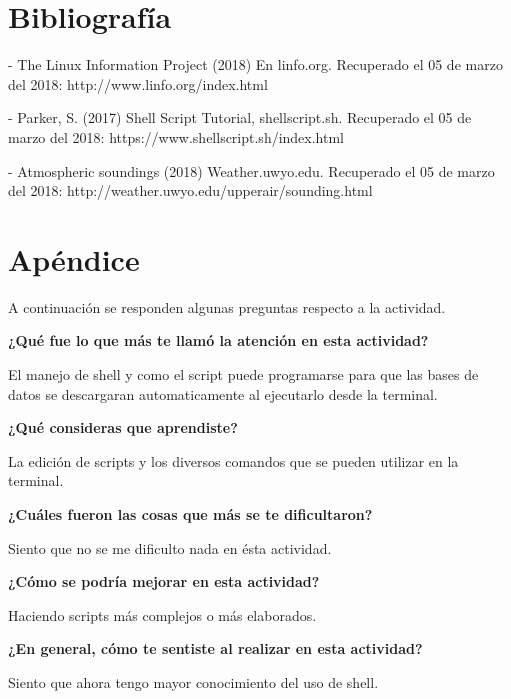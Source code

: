 \documentclass[12pt]{article}
\begin{document}
\section{Bibliografía}

- The Linux Information Project (2018) En linfo.org. Recuperado el 05 de marzo del 2018: http://www.linfo.org/index.html

- Parker, S. (2017) Shell Script Tutorial, shellscript.sh. Recuperado el 05 de marzo del 2018: https://www.shellscript.sh/index.html

- Atmospheric soundings (2018) Weather.uwyo.edu. Recuperado el 05 de marzo del 2018: http://weather.uwyo.edu/upperair/sounding.html

\section{Apéndice}

A continuación se responden algunas preguntas respecto a la actividad.

\textbf{¿Qué fue lo que más te llamó la atención en esta actividad?}

El manejo de shell y como el script puede programarse para que las bases de datos se descargaran automaticamente al ejecutarlo desde la terminal.

\textbf{¿Qué consideras que aprendiste?}

La edición de scripts y los diversos comandos que se pueden utilizar en la terminal.

\textbf{¿Cuáles fueron las cosas que más se te dificultaron?}

Siento que no se me dificulto nada en ésta actividad.

\textbf{¿Cómo se podría mejorar en esta actividad?}

Haciendo scripts más complejos o más elaborados.

\textbf{¿En general, cómo te sentiste al realizar en esta actividad?}

Siento que ahora tengo mayor conocimiento del uso de shell.
\end{document}
